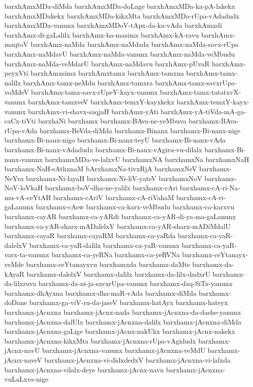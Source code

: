 {barxhAmxMDa-diMda
barxhAmxMDa-doLage
barxhAmxMDa-ka-pA-lakekx
barxhAmxMDakekx
barxhAmxMDa-kikxMta
barxhAmxMDa-rUpa-vAdadudx
barxhAmxMDa-vanunx
barxhAmxMDoV-tApx-da-ka-vAda
barxhAmxdi
barxhAmx-di-gaLalilx
barxhAmx-ha-masimx
barxhAmx-kA-ravu
barxhAmx-maqtoV
barxhAmx-naMda
barxhAmx-naMdada
barxhAmx-naMda-savx-rUpa
barxhAmx-naMdavU
barxhAmx-naMda-vanunx
barxhAmx-naMda-veMbudu
barxhAmx-naMda-veMdarU
barxhAmx-naMdavu
barxhAmx-pUvaR
barxhAmx-peyxVti
barxhAmxsimx
barxhAmxtamx
barxhAmx-tamxna
barxhAmx-tamx-nalilx
barxhAmx-tamx-neMdu
barxhAmx-tamxra
barxhAmx-tamx-savxrUpa-voMdeV
barxhAmx-tamx-savx-rUpeY-kayx-vanunx
barxhAmx-tamx-tatatxvX-vanunx
barxhAmx-tamxveV
barxhAmx-temxY-kayxkekx
barxhAmx-temxY-kayx-vanunx
barxhAmx-vi-shavx-saqjaH
barxhAmx-yAti
barxhAmx-yA-tiVda-mA-ga-caCx-tiVti
barxhaNi
barxhamx
barxhamx-BAva-ne-yeMbuva
barxhamx-BAva-rUpa-vAda
barxhamx-BeVda-diMda
barxhamx-Binanx
barxhamx-Bi-nanx-nige
barxhamx-Bi-nanx-nigo
barxhamx-Bi-nanx-teyU
barxhamx-Bi-nanx-vAda
barxhamx-Bi-nanx-vAdadudx
barxhamx-Bi-nanx-vAgiru-vu-dilalx
barxhamx-Bi-nanx-vanunx
barxhamxMDa-ve-lalxvU
barxhamxNA
barxhamxNa
barxhamxNaH
barxhamx-NaH-sAthxnaM
bArxhamxNa-tivxRjA
barxhamxNeV
barxhamx-NeYva
barxhamx-Ni-layaH
barxhamx-Ni-liV-yateV
barxhamxNoV
barxhamx-NoV-loVkaH
barxhamx-boV-dha-ne-yalilx
barxhamx-cAri
barxhamx-cA-ri-Na-mu-vA-ceYtAH
barxhamx-cAriV
barxhamx-cA-riVahaM
barxhamx-cA-ri-gaLanunx
barxhamx-cAsw
barxhamx-ca-karx-veMbudu
barxhamx-ca-karxvu
barxhamx-cayAR
barxhamx-ca-yARdi
barxhamx-ca-yAR-di-ya-ma-gaLanunx
barxhamx-ca-yAR-sharx-mADalelxV
barxhamx-ca-yAR-sharx-mADiMdalU
barxhamx-cayaR
barxhamx-cayaRM
barxhamx-ca-yaRda
barxhamx-ca-yaR-dalelxV
barxhamx-ca-yaR-dalilx
barxhamx-ca-yaR-vanunx
barxhamx-ca-yaR-varx-ta-vanunx
barxhamx-ca-yeRNa
barxhamx-ca-yeRVNa
barxhamx-ceYtanayx-veMde
barxhamx-ceYtanayxvu
barxhamxda
barxhamx-daMte
barxhamx-da-kAyaR
barxhamx-dalelxV
barxhamx-dalilx
barxhamx-da-lilx-dadxrU
barxhamx-da-lilxruva
barxhamx-da-ni-ja-savxrUpa-vanunx
barxhamx-daq-SiTx-yanunx
barxhamx-dhAyxna
barxhamx-dha-maR-vAda
barxhamx-diMda
barxhamx-doDane
barxhamx-ga-viV-ru-da-jaseV
barxhamx-hatAyx
barxhamx-hateyx
barxhamx-jAcnxna
barxhamx-jAcnx-nada
barxhamx-jAcnxna-da-dashe-yanunx
barxhamx-jAcnxna-dalUlx
barxhamx-jAcnxna-dalilx
barxhamx-jAcnxna-diMda
barxhamx-jAcnxna-gaLige
barxhamx-jAcnx-nakUkx
barxhamx-jAcnx-nakekx
barxhamx-jAcnxna-kikxMta
barxhamx-jAcnxna-rUpa-vAgidudx
barxhamx-jAcnx-navU
barxhamx-jAcnxna-vanunx
barxhamx-jAcnxna-veMdU
barxhamx-jAcnx-naveV
barxhamx-jAcnxna-vi-didxdedxV
barxhamx-jAcnxna-vi-lalxda
barxhamx-jAcnxna-vilalx-deye
barxhamx-jAcnx-navu
barxhamx-jAcnxna-vuLaLxva-nige
}
